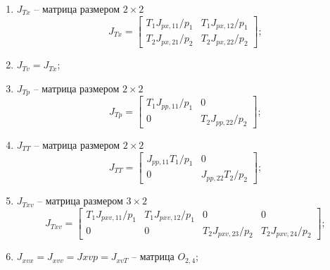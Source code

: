 \begin{enumerate}
    \item $J_{Tx}$ -- матрица размером $2 \times 2$
          \begin{equation*}
              J_{Tx} = \begin{bmatrix}
                  T_1 J_{px,11}/p_1 & T_1 J_{px,12}/p_1 \\
                  T_2 J_{px,21}/p_2 & T_2 J_{px,22}/p_2
              \end{bmatrix};
          \end{equation*}

    \item $J_{Tv} = J_{Tx}$;

    \item $J_{Tp}$ -- матрица размером $2 \times 2$
          \begin{equation*}
              J_{Tp} = \begin{bmatrix}
                  T_1 J_{pp,11}/p_1 & 0                 \\
                  0                 & T_2 J_{pp,22}/p_2
              \end{bmatrix};
          \end{equation*}

    \item $J_{TT}$ -- матрица размером $2 \times 2$
          \begin{equation*}
              J_{TT} = \begin{bmatrix}
                  J_{pp,11} T_1/p_1 & 0                 \\
                  0                 & J_{pp,22} T_2/p_2
              \end{bmatrix};
          \end{equation*}

    \item $J_{Txv}$ -- матрица размером $3 \times 2$
          \begin{equation*}
              J_{Txv} = \begin{bmatrix}
                  T_1 J_{pxv,11}/p_1 & T_1 J_{pxv,12}/p_1 & 0                  & 0                  \\
                  0                  & 0                  & T_2 J_{pxv,23}/p_2 & T_2 J_{pxv,24}/p_2
              \end{bmatrix};
          \end{equation*}

    \item $J_{xvx} = J_{xvv} = J{xvp} = J_{xvT}$ -- матрица $O_{2,4}$;


\end{enumerate}
